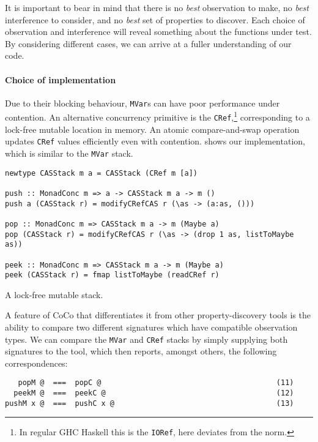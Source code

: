 It is important to bear in mind that there is no \emph{best}
observation to make, no \emph{best} interference to consider, and no
\emph{best} set of properties to discover.  Each choice of observation
and interference will reveal something about the functions under test.
By considering different cases, we can arrive at a fuller
understanding of our code.

\paragraph{Choice of implementation}
Due to their blocking behaviour, \verb|MVar|s can have poor
performance under contention.  An alternative concurrency primitive is
the \verb|CRef|,\footnote{In regular GHC Haskell this is the
  \texttt{IORef}, here \dejafu{} deviates from the norm.}
corresponding to a lock-free mutable location in memory.  An atomic
compare-and-swap operation updates \verb|CRef| values efficiently even
with contention.   shows our implementation, which
is similar to the \verb|MVar| stack.

\begin{listing}
\begin{verbatim}
newtype CASStack m a = CASStack (CRef m [a])

push :: MonadConc m => a -> CASStack m a -> m ()
push a (CASStack r) = modifyCRefCAS r (\as -> (a:as, ()))

pop :: MonadConc m => CASStack m a -> m (Maybe a)
pop (CASStack r) = modifyCRefCAS r (\as -> (drop 1 as, listToMaybe as))

peek :: MonadConc m => CASStack m a -> m (Maybe a)
peek (CASStack r) = fmap listToMaybe (readCRef r)
\end{verbatim}
\caption{A lock-free mutable stack.}
\label{lst:crefstack}
\end{listing}

A feature of CoCo that differentiates it from other property-discovery
tools is the ability to compare two different signatures which have
compatible observation types.  We can compare the \verb|MVar| and
\verb|CRef| stacks by simply supplying both signatures to the tool,
which then reports, amongst others, the following correspondences:

\begin{verbatim}
   popM @  ===  popC @                                        (11)
  peekM @  ===  peekC @                                       (12)
pushM x @  ===  pushC x @                                     (13)
\end{verbatim}

